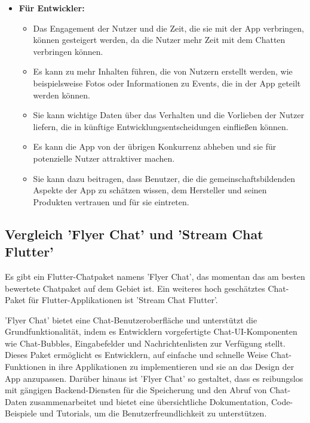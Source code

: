 \begin{itemize}
  \item \textbf{Für Entwickler:}
        \begin{itemize}
          \item {Das Engagement der Nutzer und die Zeit, die sie mit der App verbringen, können gesteigert werden, da die Nutzer mehr Zeit mit dem Chatten verbringen können.}
          \item {Es kann zu mehr Inhalten führen, die von Nutzern erstellt werden, wie beispielsweise Fotos oder Informationen zu Events, die in der App geteilt werden können.}
          \item {Sie kann wichtige Daten über das Verhalten und die Vorlieben der Nutzer liefern, die in künftige Entwicklungsentscheidungen einfließen können.}
          \item {Es kann die App von der übrigen Konkurrenz abheben und sie für potenzielle Nutzer attraktiver machen.}
          \item {Sie kann dazu beitragen, dass Benutzer, die die gemeinschaftsbildenden Aspekte der App zu schätzen wissen, dem Hersteller und seinen Produkten vertrauen und für sie eintreten.}
        \end{itemize}
\end{itemize}

\subsection{Vergleich 'Flyer Chat' und 'Stream Chat Flutter'}

Es gibt ein Flutter-Chatpaket namens 'Flyer Chat', das momentan das am besten bewertete Chatpaket auf dem Gebiet ist. Ein weiteres hoch geschätztes Chat-Paket für Flutter-Applikationen ist 'Stream Chat Flutter'.

'Flyer Chat' bietet eine Chat-Benutzeroberfläche und unterstützt die Grundfunktionalität, indem es Entwicklern vorgefertigte Chat-UI-Komponenten wie Chat-Bubbles, Eingabefelder und Nachrichtenlisten zur Verfügung stellt. Dieses Paket ermöglicht es Entwicklern, auf einfache und schnelle Weise Chat-Funktionen in ihre Applikationen zu implementieren und sie an das Design der App anzupassen. Darüber hinaus ist 'Flyer Chat' so gestaltet, dass es reibungslos mit gängigen Backend-Diensten für die Speicherung und den Abruf von Chat-Daten zusammenarbeitet und bietet eine übersichtliche Dokumentation, Code-Beispiele und Tutorials, um die Benutzerfreundlichkeit zu unterstützen.

